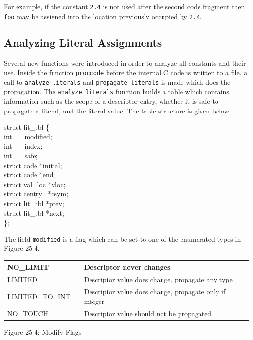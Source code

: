 For example, if the constant \texttt{2.4} is not used after the second
code fragment then \texttt{{\textquotedbl}foo{\textquotedbl}} may be
assigned into the location previously occupied by \texttt{2.4}.


\subsection{Analyzing Literal Assignments}

Several new functions were introduced in order to analyze all
constants and their use. Inside the function \texttt{proccode} before
the internal C code is written to a file, a call to
\texttt{analyze\_literals} and \texttt{propagate\_literals} is made
which does the propagation. The \texttt{analyze\_literals} function
builds a table which contains information such as the scope of a
descriptor entry, whether it is safe to propagate a literal, and the
literal value. The table structure is given below.

\begin{iconcode}
struct lit\_tbl \{ \\
\> int \ \ \ modified; \\
\> int \ \ \ index; \\
\> int \ \ \ safe; \\
\> struct code *initial; \\
\> struct code *end; \\
\> struct val\_loc *vloc; \\
\> struct centry \ *csym; \\
\> struct lit\_tbl *prev; \\
\> struct lit\_tbl *next; \\
\};
\end{iconcode}

The field \texttt{modified} is a flag which can be set to one of the
enumerated types in Figure 25-4.

\begin{center}
\tabletail{}
\tablelasttail{}
\begin{xtabular}{|m{1.4302598in}|m{0.41155985in}|m{3.7115598in}|}
\hline
{\ttfamily NO\_LIMIT} &
 &
 Descriptor never changes\\\hline
{\ttfamily LIMITED} &
 &
 Descriptor value does change, propagate any type\\\hline
{\ttfamily LIMITED\_TO\_INT} &
 &
 Descriptor value does change, propagate only if integer\\\hline
{\ttfamily NO\_TOUCH} &
 &
 Descriptor value should not be propagated\\\hline
\end{xtabular}
\end{center}
{\centering{}
Figure 25-4: Modify Flags
\par}


